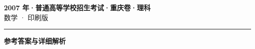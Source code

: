 \documentclass[zihao=5, a4paper]{ctexart}
\begin{document}
\begin{center}
  {\Large\bfseries 2007 年·普通高等学校招生考试·重庆卷·理科}\\[4pt]
  {\large 数学 · 印刷版}
\end{center}
\medskip
{}

\par\bigskip\hrule\bigskip
{}
\begin{center}{\large\bfseries 参考答案与详细解析}\end{center}
\smallskip

\end{document}
